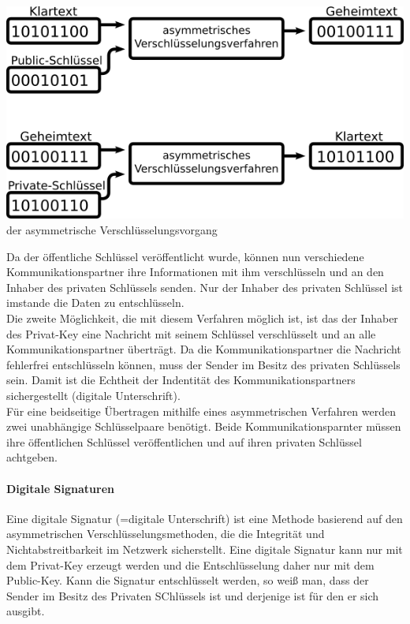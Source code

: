\documentclass[12pt,a4paper]{report}
\begin{document}
\begin{onehalfspace}
\begin{center}
\includegraphics[scale=3]{img/asym.png}\\
der asymmetrische Verschlüsselungsvorgang
\end{center}

Da der öffentliche Schlüssel veröffentlicht wurde, können nun verschiedene Kommunikationspartner ihre Informationen mit ihm verschlüsseln und an den Inhaber des privaten Schlüssels senden. Nur der Inhaber des privaten Schlüssel ist imstande die Daten zu entschlüsseln.\\
Die zweite Möglichkeit, die mit diesem Verfahren möglich ist, ist das der Inhaber des Privat-Key eine Nachricht mit seinem Schlüssel verschlüsselt und an alle Kommunikationspartner überträgt. Da die Kommunikationspartner die Nachricht fehlerfrei entschlüsseln können, muss der Sender im Besitz des privaten Schlüssels sein. Damit ist die Echtheit der Indentität des Kommunikationspartners sichergestellt (digitale Unterschrift).\\
Für eine beidseitige Übertragen mithilfe eines asymmetrischen Verfahren werden zwei unabhängige Schlüsselpaare benötigt. Beide Kommunikationsparnter müssen ihre öffentlichen Schlüssel veröffentlichen und auf ihren privaten Schlüssel achtgeben.

\paragraph{Digitale Signaturen}

Eine digitale Signatur (=digitale Unterschrift) ist eine Methode basierend auf den asymmetrischen Verschlüsselungsmethoden, die die Integrität und Nichtabstreitbarkeit im Netzwerk sicherstellt. Eine digitale Signatur kann nur mit dem Privat-Key erzeugt werden und die Entschlüsselung daher nur mit dem Public-Key. Kann die Signatur entschlüsselt werden, so weiß man, dass der Sender im Besitz des Privaten SChlüssels ist und derjenige ist für den er sich ausgibt. \cite{wiki03}


\end{onehalfspace}
\end{document}
